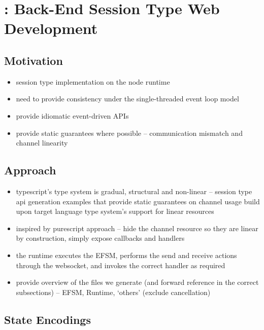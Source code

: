 \chapter{: Back-End Session Type Web Development}
\label{chap:node}

\section{Motivation}
\begin{itemize}
\item session type implementation on the node runtime
\item need to provide consistency under the single-threaded event loop model
\item provide idiomatic event-driven APIs
\item provide static guarantees where possible -- communication mismatch and channel linearity
\end{itemize}

\section{Approach}
\begin{itemize}
\item typescript's type system is gradual, structural and non-linear -- session type api generation examples that provide static guarantees on channel usage build upon target language type system's support for linear resources
\item inspired by purescript approach -- hide the channel resource so they are linear by construction, simply expose callbacks and handlers
\item the runtime executes the EFSM, performs the send and receive actions through the websocket, and invokes the correct handler as required
\item provide overview of the files we generate (and forward reference in the correct subsections) -- EFSM, Runtime, `others' (exclude cancellation)
\end{itemize}

\section{State Encodings}

